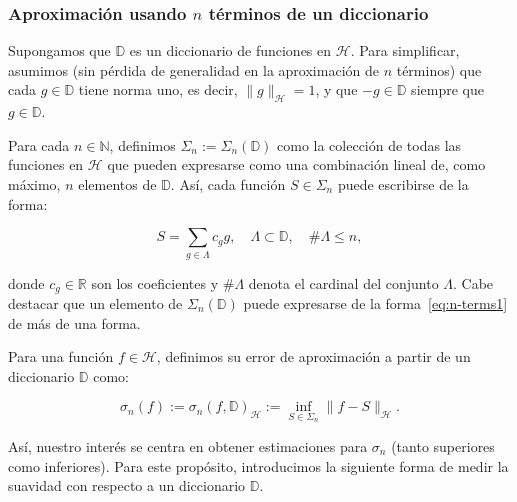 \subsubsection{Aproximación usando $n$ términos de un diccionario}\label{subsubsec:approx-n-terms}

Supongamos que $\mathbb{D}$ es un diccionario de funciones en $\mathcal{H}$. Para simplificar, asumimos (sin pérdida de generalidad en la aproximación de $n$ términos) que cada $g \in \mathbb{D}$ tiene norma uno, es decir, $\|g\|_{\mathcal{H}} = 1$, y que $-g \in \mathbb{D}$ siempre que $g \in \mathbb{D}$.\newline

Para cada $n \in \mathbb{N}$, definimos $\Sigma_n := \Sigma_n(\mathbb{D})$ como la colección de todas las funciones en $\mathcal{H}$ que pueden expresarse como una combinación lineal de, como máximo, $n$ elementos de $\mathbb{D}$. Así, cada función $S \in \Sigma_n$ puede escribirse de la forma:

\begin{equation}\label{eq:n-terms1}
    S = \sum_{g \in \Lambda} c_g g, \quad \Lambda \subset \mathbb{D}, \quad \#\Lambda \leq n,
\end{equation}

donde $c_g \in \mathbb{R}$ son los coeficientes y $\#\Lambda$ denota el cardinal del conjunto $\Lambda$. Cabe destacar que un elemento de $\Sigma_n(\mathbb{D})$ puede expresarse de la forma~\eqref{eq:n-terms1} de más de una forma.\newline

\begin{definicion}
    Para una función $f \in \mathcal{H}$, definimos su error de aproximación a partir de un diccionario $\mathbb{D}$ como:

    \[
        \sigma_n(f) := \sigma_n(f, \mathbb{D})_{\mathcal{H}} := \inf_{S \in \Sigma_n} \| f - S \|_{\mathcal{H}}.
    \]
\end{definicion}

Así, nuestro interés se centra en obtener estimaciones para $\sigma_n$ (tanto superiores como inferiores). Para este propósito, introducimos la siguiente forma de medir la suavidad con respecto a un diccionario $\mathbb{D}$.\newline

